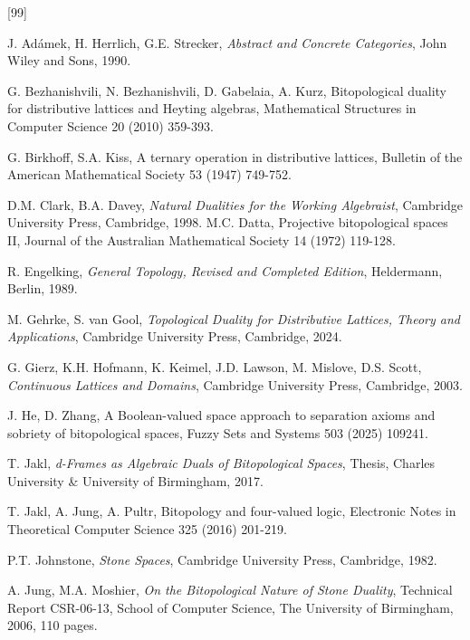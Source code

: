 \documentclass[11pt]{article}
\theoremstyle{plain}
\theoremstyle{definition}
\begin{document}
\begin{thebibliography}{[99]} \setlength{\itemsep}{0pt}

 J. Ad\'{a}mek, H. Herrlich, G.E. Strecker, \emph{Abstract and Concrete Categories}, John Wiley and Sons,  1990.

 G. Bezhanishvili, N. Bezhanishvili, D. Gabelaia,   A. Kurz,  Bitopological duality for distributive lattices and Heyting algebras,  Mathematical Structures in Computer Science   20 (2010) 359-393. 

 G. Birkhoff, S.A. Kiss, A ternary operation in distributive lattices, Bulletin of the American Mathematical Society  53 (1947) 749-752.

 D.M. Clark,   B.A. Davey, \emph{Natural Dualities for the Working Algebraist}, Cambridge University Press, Cambridge, 1998.
M.C. Datta, Projective bitopological spaces II, Journal of the Australian Mathematical Society  14 (1972)  119-128.

 R. Engelking, \emph{General Topology, Revised and Completed Edition}, Heldermann, Berlin, 1989. 

 M. Gehrke, S. van Gool, \emph{Topological Duality for Distributive Lattices, Theory and Applications}, Cambridge University Press, Cambridge, 2024.

 G. Gierz, K.H. Hofmann, K. Keimel, J.D. Lawson, M. Mislove,   D.S. Scott, \emph{Continuous Lattices and Domains}, Cambridge University Press, Cambridge, 2003.
 
J. He, D. Zhang, A Boolean-valued space approach to separation axioms and sobriety of bitopological spaces, Fuzzy Sets and Systems 503 (2025)  109241.
 
 T. Jakl,   \emph{d-Frames as Algebraic Duals of Bitopological Spaces}, Thesis, Charles University \& University of Birmingham, 2017. 

 T. Jakl, A. Jung, A. Pultr,  Bitopology and four-valued logic, Electronic Notes in Theoretical Computer Science 325 (2016) 201-219.

 P.T. Johnstone, \emph{Stone Spaces}, Cambridge University Press, Cambridge, 1982.

 A. Jung, M.A. Moshier, \emph{On the Bitopological Nature of Stone Duality}, Technical Report CSR-06-13, School of Computer Science, The University of Birmingham, 2006, 110 pages.  
	

\end{thebibliography}
\end{document}
